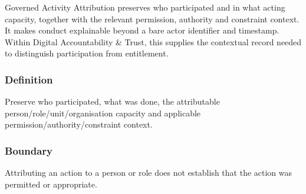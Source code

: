 Governed Activity Attribution preserves who participated and in what acting capacity, together with the relevant permission, authority and constraint context. It makes conduct explainable beyond a bare actor identifier and timestamp. Within Digital Accountability \& Trust, this supplies the contextual record needed to distinguish participation from entitlement.

\subsubsection*{Definition}

Preserve who participated, what was done, the attributable person/\allowbreak{}role/\allowbreak{}unit/\allowbreak{}organisation capacity and applicable permission/\allowbreak{}authority/\allowbreak{}constraint context.

\subsubsection*{Boundary}

Attributing an action to a person or role does not establish that the action was permitted or appropriate.

